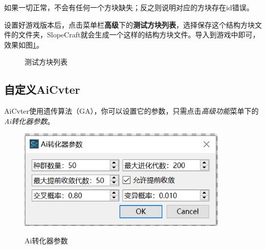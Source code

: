 \documentclass[UTF8]{ctexart}
\begin{document}
如果一切正常，不会有任何一个方块缺失；反之则说明对应的方块存在id错误。

设置好游戏版本后，点击菜单栏\textbf{高级}下的\textbf{测试方块列表}，选择保存这个结构方块文件的文件夹，SlopeCraft就会生成一个这样的结构方块文件。导入到游戏中即可，效果如图\ref*{testBlockListNBT}。

\begin{figure}[htbp]
    \centering
    \caption{测试方块列表}
    \label{testBlockListNBT}
\end{figure}

\subsection{自定义AiCvter}
\label{CustomizeAiCvter}
AiCvter使用遗传算法（GA），你可以设置它的参数，只需点击\textit{高级功能}菜单下的\textit{Ai转化器参数}。

\begin{figure}[htbp]
    \centering
    \includegraphics[width=10cm]{Img13_AiCvterParameters.png}
    \label{GAOpt}
    \caption{Ai转化器参数}
\end{figure}
\end{document}
